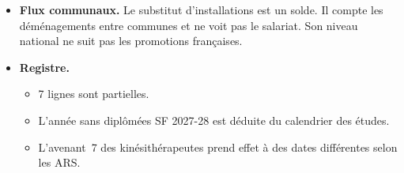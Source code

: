 \begin{itemize}
  \begin{itemize}
    \item L'Annuaire est un instantané de novembre, la DREES compte au 1\textsuperscript{er} janvier. 11,5\,\% des
    activités dentaires n'y ont pas de commune.
    \item Le seuil de 30 est une convention, que seul le banc peut remplacer.
  \end{itemize}
  \item \textbf{Flux communaux.} Le substitut d'installations est un solde. Il compte les déménagements entre
  communes et ne voit pas le salariat. Son niveau national ne suit pas les promotions françaises.
  \item \textbf{Registre.}
  \begin{itemize}
    \item 7 lignes sont partielles.
    \item L'année sans diplômées SF 2027-28 est déduite du calendrier des études.
    \item L'avenant~7 des kinésithérapeutes prend effet à des dates différentes selon les ARS.
  \end{itemize}
\end{itemize}

